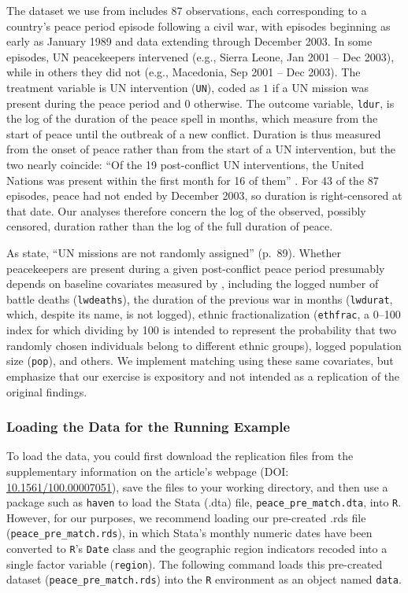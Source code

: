 \documentclass[twoside,11pt]{article}
\begin{document}
The dataset we use from \citet{gilligansergenti2008} includes 87
observations, each corresponding to a country's peace period episode
following a civil war, with episodes beginning as early as January 1989
and data extending through December 2003. In some episodes, UN
peacekeepers intervened (e.g., Sierra Leone, Jan 2001 -- Dec 2003), while
in others they did not (e.g., Macedonia, Sep 2001 -- Dec 2003). The
treatment variable is UN intervention (\texttt{UN}), coded as \(1\) if a
UN mission was present during the peace period and \(0\) otherwise. The
outcome variable, \texttt{ldur}, is the log of the duration of the peace
spell in months, which \citet{gilligansergenti2008} measure from the start of
peace until the outbreak of a new conflict. Duration is thus measured from the
onset of peace rather than from the start of a UN intervention, but the two
nearly coincide: ``Of the 19 post-conflict UN interventions, the United Nations
was present within the first month for 16 of them''
\citep[p.~118]{gilligansergenti2008}. For 43 of the 87 episodes, peace had not
ended by December 2003, so duration is right-censored at that date. Our analyses
therefore concern the log of the observed, possibly censored, duration rather
than the log of the full duration of peace.

As \citet{gilligansergenti2008} state, ``UN missions are not randomly
assigned'' (p.~89). Whether peacekeepers are present during a given
post-conflict peace period presumably depends on baseline covariates
measured by \citet{gilligansergenti2008}, including the logged number of
battle deaths (\texttt{lwdeaths}), the duration of the previous war in months
(\texttt{lwdurat}, which, despite its name, is not logged), ethnic fractionalization (\texttt{ethfrac}, a 0--100
index for which dividing by 100 is intended to represent the probability
that two randomly chosen individuals belong to different ethnic groups),
logged population size (\texttt{pop}), and others. We implement matching
using these same covariates, but emphasize that our exercise is
expository and not intended as a replication of the original findings.

\subsubsection{Loading the Data for the Running
Example}\label{loading-the-data-for-the-running-example}

To load the data, you could first download the replication files from
the supplementary information on the article's webpage (DOI:
\href{https://doi.org/10.1561/100.00007051}{10.1561/100.00007051}), save
the files to your working directory, and then use a package such as
\texttt{haven} to load the Stata (.dta) file,
\texttt{peace\_pre\_match.dta}, into \texttt{R}. However, for our
purposes, we recommend loading our pre-created .rds file
(\texttt{peace\_pre\_match.rds}), in which Stata's monthly numeric dates
have been converted to \texttt{R}'s \texttt{Date} class and the geographic
region indicators recoded into a single factor variable
(\texttt{region}). The following command loads this pre-created dataset
(\texttt{peace\_pre\_match.rds}) into the \texttt{R} environment as an
object named \texttt{data}.
\end{document}
